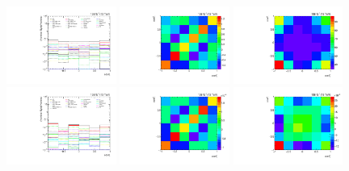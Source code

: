 \begin{figure}[htb]
\begin{center}
 \includegraphics[width=0.32\textwidth]{fig_fullRun2UL/unfolding/combined/deltaSystCombinedlog_rebinnedB_b1r.pdf}
 \includegraphics[width=0.32\textwidth]{fig_fullRun2UL/unfolding/combined/StatCovMatrix_rebinnedB_b1r.pdf}
 \includegraphics[width=0.32\textwidth]{fig_fullRun2UL/unfolding/combined/TotalSystCovMatrix_rebinnedB_b1r.pdf} \\
 \includegraphics[width=0.32\textwidth]{fig_fullRun2UL/unfolding/combined/deltaSystCombinedlogNorm_rebinnedB_b1r.pdf}
 \includegraphics[width=0.32\textwidth]{fig_fullRun2UL/unfolding/combined/StatCovMatrixNorm_rebinnedB_b1r.pdf}
 \includegraphics[width=0.32\textwidth]{fig_fullRun2UL/unfolding/combined/TotalSystCovMatrixNorm_rebinnedB_b1r.pdf} \\

\end{center}
\end{figure}
